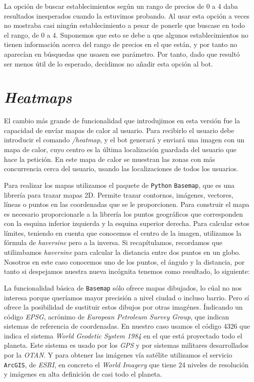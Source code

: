 \documentclass[oneside]{memoir}
\begin{document}
La opción de buscar establecimientos según un rango de precios de 0 a 4 daba resultados inesperados cuando la estuvimos probando. Al usar esta opción a veces no mostraba casi ningún establecimiento a pesar de ponerle que buscase en todo el rango, de 0 a 4. Suponemos que esto se debe a que algunos establecimientos no tienen información acerca del rango de precios en el que están, y por tanto no aparecían en búsquedas que usasen ese parámetro. Por tanto, dado que resultó ser menos útil de lo esperado, decidimos no añadir esta opción al bot.


\section{\textit{Heatmaps}}
El cambio más grande de funcionalidad que introdujimos en esta versión fue la capacidad de envíar mapas de calor al usuario. Para recibirlo el usuario debe introducir el comando \textit{/heatmap}, y el bot generará y enviará una imagen con un mapa de calor, cuyo centro es la última localización guardada del usuario que hace la petición. En este mapa de calor se muestran las zonas con más concurrencia cerca del usuario, usando las localizaciones de todos los usuarios.

Para realizar los mapas utilizamos el paquete de \texttt{Python} \texttt{Basemap}, que es una librería para trazar mapas 2D. Permite trazar contornos, imágenes, vectores, líneas o puntos en las coordenadas que se le proporcionen. Para construir el mapa es necesario proporcionarle a la librería los puntos geográficos que corresponden con la esquina inferior izquierda y la esquina superior derecha. Para calcular estos límites, teniendo en cuenta que conocemos el centro de la imagen, utilizamos la fórmula de \textit{haversine} pero a la inversa. Si recapítulamos, recordamos que utilizabamos \textit{haversine} para calcular la distancia entre dos puntos en un globo. Nosotros en este caso conocemos uno de los puntos, el ángulo y la distancia, por tanto si despejamos nuestra nueva incógnita tenemos como resultado, lo siguiente:
 


La funcionalidad básica de \texttt{Basemap} sólo ofrece mapas dibujados, lo cúal no nos interesa porque queríamos mayor precisión a nivel ciudad o incluso barrio. Pero sí ofrece la posibilidad de sustituir estos dibujos por otras imagénes. Índicando un código \textit{EPSG}, acrónimo de \textit{European Petroleum Survey Group}, que indican sistemas de referencia de coordenadas. En nuestro caso usamos el código 4326 que indica el sistema \textit{World Geodetic System 1984} en el que está proyectado todo el planeta. Este sistema es usado por los \textit{GPS} y por sistemas militares desarrollados por la \textit{OTAN}. Y para obtener las imágenes vía satélite utilizamos el servicio \texttt{ArcGIS}, de \textit{ESRI}, en concreto el \textit{World Imagery} que tiene 24 niveles de resolución y imágenes en alta definición de casi todo el planeta.
\end{document}
